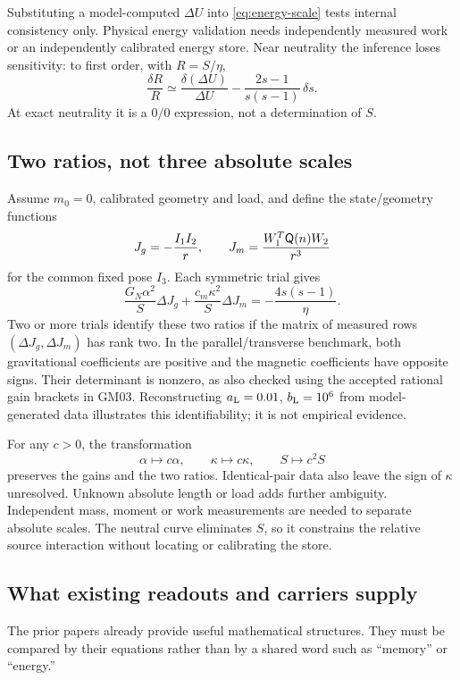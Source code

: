 Substituting a model-computed \(\Delta U\) into \eqref{eq:energy-scale} tests internal consistency only. Physical energy validation needs independently measured work or an independently calibrated energy store. Near neutrality the inference loses sensitivity: to first order, with \(R=S/\eta\),
\[
 \frac{\delta R}{R}\simeq
 \frac{\delta(\Delta U)}{\Delta U}
 -\frac{2s-1}{s(s-1)}\,\delta s.
\]
At exact neutrality it is a \(0/0\) expression, not a determination of \(S\).

\subsection{Two ratios, not three absolute scales}
Assume \(m_0=0\), calibrated geometry and load, and define the state/geometry functions
\[
 J_g=-\frac{I_1I_2}{r},\qquad
 J_m=\frac{W_1^T\mathsf Q(n)W_2}{r^3}
\]
for the common fixed pose \(I_3\). Each symmetric trial gives
\begin{equation}
 \frac{G_N\alpha^2}{S}\Delta J_g+
 \frac{c_m\kappa^2}{S}\Delta J_m
 =-\frac{4s(s-1)}{\eta}.
 \label{eq:ratios}
\end{equation}
Two or more trials identify these two ratios if the matrix of measured rows
\((\Delta J_g,\Delta J_m)\) has rank two. In the parallel/transverse benchmark, both gravitational coefficients are positive and the magnetic coefficients have opposite signs. Their determinant is nonzero, as also checked using the accepted rational gain brackets in GM03. Reconstructing \(a_{\rm L}=0.01\), \(b_{\rm L}=10^6\) from model-generated data illustrates this identifiability; it is not empirical evidence.

For any \(c>0\), the transformation
\begin{equation}
 \alpha\mapsto c\alpha,\qquad
 \kappa\mapsto c\kappa,\qquad S\mapsto c^2S
 \label{eq:scale}
\end{equation}
preserves the gains and the two ratios. Identical-pair data also leave the sign of \(\kappa\) unresolved. Unknown absolute length or load adds further ambiguity. Independent mass, moment or work measurements are needed to separate absolute scales. The neutral curve eliminates \(S\), so it constrains the relative source interaction without locating or calibrating the store.

\subsection{What existing readouts and carriers supply}
The prior papers already provide useful mathematical structures. They must be compared by their equations rather than by a shared word such as “memory” or “energy.”

